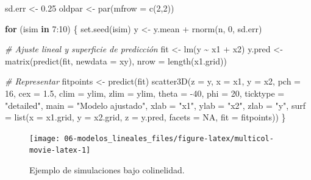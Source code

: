 \documentclass[
]{book}
\newenvironment{Shaded}{\begin{snugshade}}{\end{snugshade}}
\newcommand{\AttributeTok}[1]{\textcolor[rgb]{0.77,0.63,0.00}{#1}}
\newcommand{\CommentTok}[1]{\textcolor[rgb]{0.56,0.35,0.01}{\textit{#1}}}
\newcommand{\ConstantTok}[1]{\textcolor[rgb]{0.00,0.00,0.00}{#1}}
\newcommand{\ControlFlowTok}[1]{\textcolor[rgb]{0.13,0.29,0.53}{\textbf{#1}}}
\newcommand{\DecValTok}[1]{\textcolor[rgb]{0.00,0.00,0.81}{#1}}
\newcommand{\FloatTok}[1]{\textcolor[rgb]{0.00,0.00,0.81}{#1}}
\newcommand{\FunctionTok}[1]{\textcolor[rgb]{0.00,0.00,0.00}{#1}}
\newcommand{\NormalTok}[1]{#1}
\newcommand{\OtherTok}[1]{\textcolor[rgb]{0.56,0.35,0.01}{#1}}
\newcommand{\SpecialCharTok}[1]{\textcolor[rgb]{0.00,0.00,0.00}{#1}}
\newcommand{\StringTok}[1]{\textcolor[rgb]{0.31,0.60,0.02}{#1}}
\theoremstyle{break}
\theoremstyle{definition}
\theoremstyle{definition}
\theoremstyle{definition}
\theoremstyle{definition}
\theoremstyle{remark}
\begin{document}
\begin{Shaded}
\begin{Highlighting}[]
\NormalTok{sd.err }\OtherTok{\textless{}{-}} \FloatTok{0.25}
\NormalTok{oldpar }\OtherTok{\textless{}{-}} \FunctionTok{par}\NormalTok{(}\AttributeTok{mfrow =} \FunctionTok{c}\NormalTok{(}\DecValTok{2}\NormalTok{,}\DecValTok{2}\NormalTok{))}

\ControlFlowTok{for}\NormalTok{ (isim }\ControlFlowTok{in} \DecValTok{7}\SpecialCharTok{:}\DecValTok{10}\NormalTok{) \{}
  \FunctionTok{set.seed}\NormalTok{(isim)}
\NormalTok{  y }\OtherTok{\textless{}{-}}\NormalTok{ y.mean }\SpecialCharTok{+} \FunctionTok{rnorm}\NormalTok{(n, }\DecValTok{0}\NormalTok{, sd.err)}
  
  \CommentTok{\# Ajuste lineal y superficie de predicción}
\NormalTok{  fit }\OtherTok{\textless{}{-}} \FunctionTok{lm}\NormalTok{(y }\SpecialCharTok{\textasciitilde{}}\NormalTok{ x1 }\SpecialCharTok{+}\NormalTok{ x2)}
\NormalTok{  y.pred }\OtherTok{\textless{}{-}} \FunctionTok{matrix}\NormalTok{(}\FunctionTok{predict}\NormalTok{(fit, }\AttributeTok{newdata =}\NormalTok{ xy), }\AttributeTok{nrow =} \FunctionTok{length}\NormalTok{(x1.grid)) }
  
  \CommentTok{\# Representar}
\NormalTok{  fitpoints }\OtherTok{\textless{}{-}} \FunctionTok{predict}\NormalTok{(fit) }
  \FunctionTok{scatter3D}\NormalTok{(}\AttributeTok{z =}\NormalTok{ y, }\AttributeTok{x =}\NormalTok{ x1, }\AttributeTok{y =}\NormalTok{ x2, }\AttributeTok{pch =} \DecValTok{16}\NormalTok{, }\AttributeTok{cex =} \FloatTok{1.5}\NormalTok{, }\AttributeTok{clim =}\NormalTok{ ylim, }\AttributeTok{zlim =}\NormalTok{ ylim,}
            \AttributeTok{theta =} \SpecialCharTok{{-}}\DecValTok{40}\NormalTok{, }\AttributeTok{phi =} \DecValTok{20}\NormalTok{, }\AttributeTok{ticktype =} \StringTok{"detailed"}\NormalTok{, }
            \AttributeTok{main =} \StringTok{"Modelo ajustado"}\NormalTok{, }\AttributeTok{xlab =} \StringTok{"x1"}\NormalTok{, }\AttributeTok{ylab =} \StringTok{"x2"}\NormalTok{, }\AttributeTok{zlab =} \StringTok{"y"}\NormalTok{, }
            \AttributeTok{surf =} \FunctionTok{list}\NormalTok{(}\AttributeTok{x =}\NormalTok{ x1.grid, }\AttributeTok{y =}\NormalTok{ x2.grid, }\AttributeTok{z =}\NormalTok{ y.pred, }
                        \AttributeTok{facets =} \ConstantTok{NA}\NormalTok{, }\AttributeTok{fit =}\NormalTok{ fitpoints))}
\NormalTok{\}}
\end{Highlighting}
\end{Shaded}

\begin{figure}[!htb]

{\centering \texttt{[image: 06-modelos\_lineales\_files/figure-latex/multicol-movie-latex-1]} 

}

\caption{Ejemplo de simulaciones bajo colinelidad.}\label{fig:multicol-movie-latex}
\end{figure}
\end{document}
